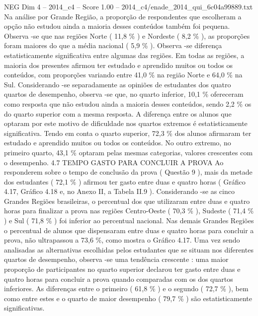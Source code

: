 \begin{textsample}{NEG Dim 4 – 2014\_c4 – Score 1.00 – 2014\_c4/enade\_2014\_qui\_6c04a99889.txt}
Na análise por Grande Região, a proporção de respondentes que escolheram a opção não estudou ainda a maioria desses conteúdos também foi pequena.
Observa -se que nas regiões Norte ( 11,8 \% ) e Nordeste ( 8,2 \% ), as proporções foram maiores do que a média nacional ( 5,9 \% ).
Observa -se diferença estatisticamente significativa entre algumas das regiões.
Em todas as regiões, a maioria dos presentes afirmou ter estudado e aprendido muitos ou todos os conteúdos, com proporções variando entre 41,0 \% na região Norte e 64,0 \% na Sul.
Considerando -se separadamente as opiniões de estudantes dos quatro quartos de desempenho, observa -se que, no quarto inferior, 10,1 \% ofereceram como resposta que não estudou ainda a maioria desses conteúdos, sendo 2,2 \% os do quarto superior com a mesma resposta.
A diferença entre os alunos que optaram por este motivo de dificuldade nos quartos extremos é estatisticamente significativa.
Tendo em conta o quarto superior, 72,3 \% dos alunos afirmaram ter estudado e aprendido muitos ou todos os conteúdos.
No outro extremo, no primeiro quarto, 43,1 \% optaram pelas mesmas categorias, valores crescentes com o desempenho. 4.7 TEMPO GASTO PARA CONCLUIR A PROVA Ao responderem sobre o tempo de conclusão da prova ( Questão 9 ), mais da metade dos estudantes ( 72,1 \% ) afirmou ter gasto entre duas e quatro horas ( Gráfico 4.17, Gráfico 4.18 e, no Anexo II, a Tabela II.9 ).
Considerando -se as cinco Grandes Regiões brasileiras, o percentual dos que utilizaram entre duas e quatro horas para finalizar a prova nas regiões Centro-Oeste ( 70,3 \% ), Sudeste ( 71,4 \% ) e Sul ( 71,8 \% ) foi inferior ao percentual nacional.
Nas demais Grandes Regiões o percentual de alunos que dispensaram entre duas e quatro horas para concluir a prova, não ultrapassou a 73,6 \%, como mostra o Gráfico 4.17.
Uma vez sendo analisadas as alternativas escolhidas pelos estudantes que se situam nos diferentes quartos de desempenho, observa -se uma tendência crescente : uma maior proporção de participantes no quarto superior declarou ter gasto entre duas e quatro horas para concluir a prova quando comparadas com os dos quartos inferiores.
As diferenças entre o primeiro ( 61,8 \% ) e o segundo ( 72,7 \% ), bem como entre estes e o quarto de maior desempenho ( 79,7 \% ) são estatisticamente significativas.

\end{textsample}
